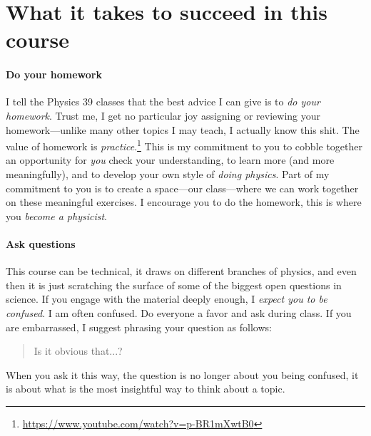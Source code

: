 \documentclass[12pt, oneside]{report}    %
\let\oldsection\section
\def\section{%
  \setcounter{sidenote}{1}%
  \oldsection
}
\begin{document}
\section{What it takes to succeed in this course}

\paragraph{Do your homework} I tell the Physics 39 classes that the best advice I can give is to \emph{do your homework}. Trust me, I get no particular joy assigning or reviewing your homework---unlike many other topics I may teach, I actually know this shit. The value of homework is \emph{practice}.\footnote{\url{https://www.youtube.com/watch?v=p-BR1mXwtB0}} This is my commitment to you to cobble together an opportunity for \emph{you} check your understanding, to learn more (and more meaningfully), and to develop your own style of \emph{doing physics}. Part of my commitment to you is to create a space---our class---where we can work together on these meaningful exercises. I encourage you to do the homework, this is where you \emph{become a physicist}.

\paragraph{Ask questions} This course can be technical, it draws on different branches of physics, and even then it is just scratching the surface of some of the biggest open questions in science. If you engage with the material deeply enough, I \emph{expect you to be confused}. I am often confused. Do everyone a favor and ask during class. If you are embarrassed, I suggest phrasing your question as follows:
\begin{quote}
Is it obvious that...?
\end{quote}
When you ask it this way, the question is no longer about you being confused, it is about what is the most insightful way to think about a topic.
\end{document}
